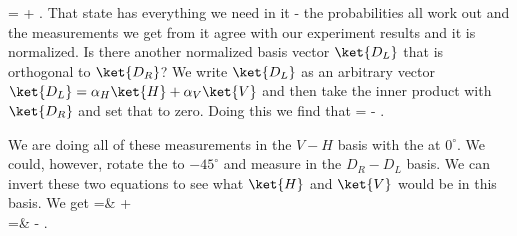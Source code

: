 \beq
{} =  + .
\label{eq:drcomp}
\eeq
That state has everything we need in it - the probabilities all work out and the measurements we get from it agree with our experiment results and it is normalized. Is there another normalized basis vector $\ket{D_L}$ that is orthogonal to $\ket{D_R}$? We write $\ket{D_L}$ as an arbitrary vector $\ket{D_L} = \alpha_H\ket{H} + \alpha_V\ket{V}$ and then take the inner product with $\ket{D_R}$ and set that to zero. Doing this we find that 
\beq
{}  =  - .
\label{eq:dlcomp}
\eeq

We are doing all of these measurements in the $V-H$ basis with the \hwp at $0^\circ$. We could, however, rotate the \hwp to $-45^\circ$ and measure in the $D_R-D_L$ basis. We can invert these two equations to see what $\ket{H}$ and $\ket{V}$ would be in this basis. We get
\bas
{} =& + \\
 =&  - .
\eas
%
